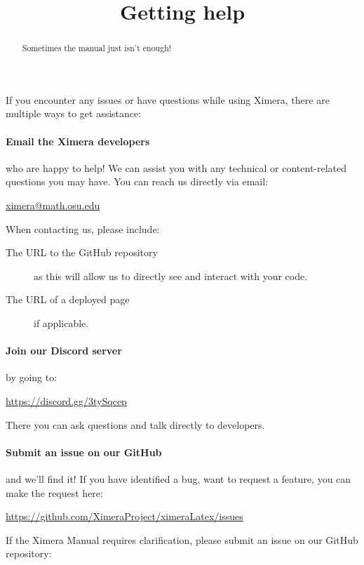 \documentclass{ximera}
\title{Getting help}
\begin{document}
\begin{abstract}
    Sometimes the manual just isn't enough!
\end{abstract}
\maketitle

If you encounter any issues or have questions while using Ximera, there are
multiple ways to get assistance:

\paragraph{Email the Ximera developers} who are happy to help! We can assist
you with any technical or content-related questions you may have. You can reach
us directly via email:
\begin{center}
    \url{ximera@math.osu.edu}
\end{center}

When contacting us, please include: 
\begin{description}
    \item[The URL to the GitHub repository] as this will allow us to directly see and interact with your code. 
    \item[The URL of a deployed page] if applicable. 
\end{description}



\paragraph{Join our Discord server} by going to:
\begin{center}
    \url{https://discord.gg/3tySqcep}
\end{center}
There you can ask questions and talk directly to developers.



\paragraph{Submit an issue on our GitHub} and we'll find it! 
If you have identified a bug, want to request a feature, you can make the request here:
\begin{center}
    \url{https://github.com/XimeraProject/ximeraLatex/issues}
\end{center}
If the Ximera Manual requires clarification, please submit an issue on our GitHub repository:
\end{document}
